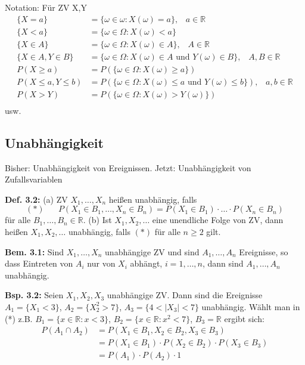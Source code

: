 \documentclass[a4paper,11pt]{article}
\begin{document}
\vspace{6pt}
\noindent Notation: Für ZV X,Y
\begin{align*}
\{X=a\} &= \{\omega\in\omega: X(\omega)=a\}, \hspace{10pt}a\in\mathbb{R}\\
\{X < a\} &= \{\omega\in\Omega: X(\omega)<a\} \\
\{X \in A\} &= \{\omega\in\Omega: X(\omega)\in A\}, \hspace{10pt}A\in\mathbb{R}\\
\{X\in A, Y\in B\} &= \{\omega\in\Omega: X(\omega)\in A \text{ und } Y(\omega)\in B\}, \hspace{10pt}A,B\in\mathbb{R}\\
P(X\geq a) &= P(\{\omega\in\Omega: X(\omega)\geq a\})\\
P(X\leq a, Y\leq b) &= P(\{\omega\in\Omega: X(\omega)\leq a \text{ und } Y(\omega)\leq b\}), \hspace{10pt}a,b\in\mathbb{R}\\
P(X>Y) &= P(\{\omega\in\Omega: X(\omega)>Y(\omega)\})\\
\end{align*}
usw. 

\subsection{Unabhängigkeit}
\noindent Bisher: Unabhängigkeit von Ereignissen.
\newline Jetzt: Unabhängigkeit von Zufallsvariablen

\vspace{6pt}
\noindent\textbf{Def. 3.2:} 
\newline (a) ZV $X_1,\dots,X_n$ heißen unabhängig, falls
\[ (*) \hspace{20pt} P(X_1\in B_1,\dots,X_n\in B_n)=P(X_1\in B_1)\cdot\dots\cdot P(X_n\in B_n)\] für alle $B_1,\dots,B_n \in \mathbb{R}$.
\newline (b) Ist $X_1,X_2,\dots$ eine unendliche Folge von ZV, dann heißen $X_1,X_2,\dots$ unabhängig, falls $(*)$ für alle $n\geq 2$ gilt.

\vspace{6pt}
\noindent\textbf{Bem. 3.1:} Sind $X_1,\dots,X_n$ unabhängige ZV und sind $A_1,\dots,A_n$ Ereignisse, so dass Eintreten von $A_i$ nur von $X_i$ abhängt, $i=1,\dots,n$, dann sind $A_1,\dots,A_n$ unabhängig.

\vspace{6pt}
\noindent\textbf{Bsp. 3.2:} Seien $X_1,X_2,X_3$ unabhängige ZV. Dann sind die Ereignisse $A_1=\{X_1<3\}$, $A_2=\{X_2^2>7\}$, $A_3=\{4<|X_3|<7\}$ unabhängig.
\newline Wählt man in (*) z.B. $B_1=\{x\in \mathbb{R}:x<3\}$, $B_2=\{x\in \mathbb{R}: x^2<7\}$, $B_3 = \mathbb{R}$ ergibt sich:
\begin{align*}
    P(A_1\cap A_2) &= P(X_1\in B_1,X_2\in B_2,X_3\in B_3) \\
    &= P(X_1\in B_1) \cdot P(X_2\in B_2) \cdot P(X_3\in B_3)\\ 
    &= P(A_1)\cdot P(A_2)\cdot1\\
\end{align*}
\end{document}
